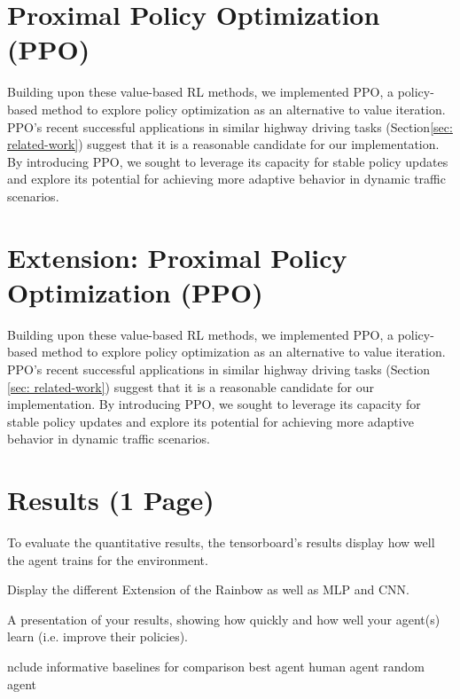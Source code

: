 \documentclass{article}
\begin{document}
\section{Proximal Policy Optimization (PPO)}
Building upon these value-based RL methods, we implemented PPO, a policy-based method to explore policy optimization as an alternative to value iteration. 
PPO's recent successful applications in similar highway driving tasks (Section\ref{sec: related-work}) suggest that it is a reasonable candidate for our implementation. 
By introducing PPO, we sought to leverage its capacity for stable policy updates and explore its potential for achieving more adaptive behavior in dynamic traffic scenarios.




\section{Extension: Proximal Policy Optimization (PPO)}
Building upon these value-based RL methods, we implemented PPO, a policy-based method to explore policy optimization as an alternative to value iteration. PPO's recent successful applications in similar highway driving tasks (Section \ref{sec: related-work}) suggest that it is a reasonable candidate for our implementation. By introducing PPO, we sought to leverage its capacity for stable policy updates and explore its potential for achieving more adaptive behavior in dynamic traffic scenarios.



\section{Results (1 Page)}
To evaluate the quantitative results, the tensorboard's results display how well the agent trains for the environment.

Display the different Extension of the Rainbow as well as MLP and CNN.

A presentation of your results, showing how quickly and how well your agent(s) learn (i.e. improve their policies).

nclude informative baselines for comparison 
best agent
human agent
random agent

\end{document}

